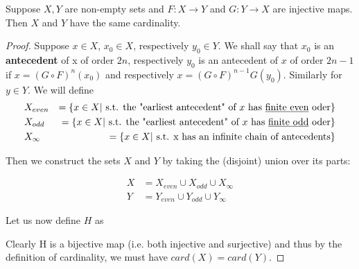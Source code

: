 \begin{thrm}
\newline
Suppose $X,Y$ are non-empty sets and $F: X\to Y$ and $G: Y\to X$ are injective maps. Then $X$ and $Y$ have the same cardinality.
\begin{proof}
Suppose $x\in X$, $x_0 \in X$, respectively $y_0\in Y$. \newline 
We shall say that $x_0$ is an \textbf{antecedent} of x of order $2n$, respectively $y_0$ is an antecedent of $x$ of order $2n-1$ if $x=(G\circ F)^n(x_0)$ and respectively $x=(G\circ F)^{n-1}G(y_0)$. Similarly for $y\in Y$.\newline
We will define 
\begin{eqnarray*}
 &X_{even} &= \left\{ x\in X | \text{ s.t. the "earliest antecedent" of } x \text{ has \underline{finite even} oder}\right\}\\
 &X_{odd} &= \left\{x\in X | \text{ s.t. the "earliest antecedent" of } x \text{ has \underline{finite odd} oder}\right\}\\
 &X_\infty &= \left\{x\in X | \text{ s.t. x has an infinite chain of antecedents}\right\}
\end{eqnarray*}

Then we construct the sets $X$ and $Y$ by taking the (disjoint) union over its parts:

\begin{align*}
X &= X_{even} \cup X_{odd} \cup X_\infty \\
Y &= Y_{even} \cup Y_{odd} \cup Y_\infty
\end{align*}

Let us now define $H$ as 

\begin{center}
\end{center}

Clearly H is a bijective map (i.e. both injective and surjective) and thus by the definition of cardinality, we must have $card(X)=card(Y)$.

\end{proof}
\end{thrm}

